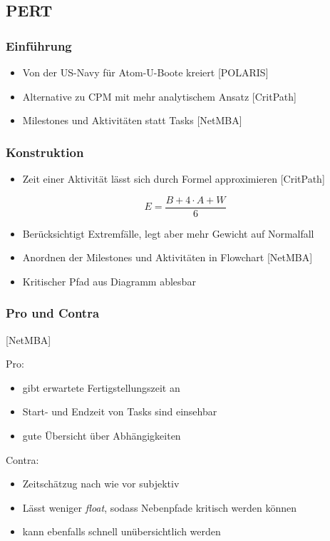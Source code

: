 \documentclass[%
	handout
]{beamer}
\newcommand{\polaris}{[POLARIS]}
\newcommand{\pert}{[CritPath]}
\newcommand{\netmba}{[NetMBA]}
\begin{document}
	\subsection{PERT}
		\begin{frame}
			\frametitle{Einführung}
			\begin{itemize}
				\item Von der US-Navy für Atom-U-Boote kreiert \polaris\pause
				\item Alternative zu CPM mit mehr analytischem Ansatz \pert\pause
				\item Milestones und Aktivitäten statt Tasks \netmba
			\end{itemize}
		\end{frame}
		
		\begin{frame}
			\frametitle{Konstruktion}
			\begin{itemize}
				\item Zeit einer Aktivität lässt sich durch Formel approximieren \pert\pause
			\end{itemize}
			\[
				E = \frac{B +4\cdot A+W}{6}
			\]\pause
			\begin{itemize}
				\item Berücksichtigt Extremfälle, legt aber mehr Gewicht auf Normalfall\pause
				\item Anordnen der Milestones und Aktivitäten in Flowchart \netmba\pause
				\item Kritischer Pfad aus Diagramm ablesbar
			\end{itemize}
		\end{frame}
		
		\begin{frame}
			\frametitle{Pro und Contra}
			\netmba\\
			\begin{minipage}[t]{.48\textwidth}
				Pro:
				\begin{itemize}
					\item gibt erwartete Fertigstellungszeit an
					\item Start- und Endzeit von Tasks sind einsehbar
					\item gute Übersicht über Abhängigkeiten
				\end{itemize}
			\end{minipage}
			\pause
			\begin{minipage}[t]{.48\textwidth}
				Contra:
				\begin{itemize}
					\item Zeitschätzug nach wie vor subjektiv
					\item Lässt weniger \textit{float}, sodass Nebenpfade kritisch werden können
					\item kann ebenfalls schnell unübersichtlich werden
				\end{itemize}
			\end{minipage}
		\end{frame}
		
\end{document}
